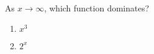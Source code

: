 \bigskip

\item As $x \rightarrow \infty$, which function dominates?

\begin{enumerate}
\item $x^3$
\item $2^x$
\end{enumerate}

